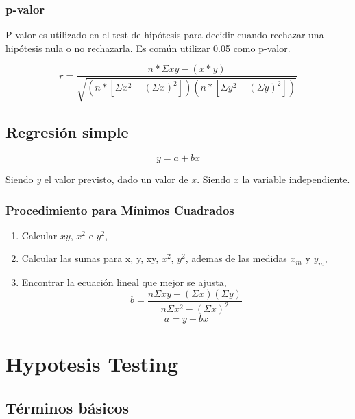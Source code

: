 \documentclass[]{article}
\begin{document}
\subsubsection{p-valor}

P-valor es utilizado en el test de hipótesis para decidir cuando rechazar una hipótesis nula o no rechazarla. Es común utilizar 0.05 como p-valor. 

\begin{equation}
r = \frac{n*\Sigma xy - (x*y)}{\sqrt{(n*[\Sigma x^2- (\Sigma x)^2])(n*[\Sigma y^2- (\Sigma y)^2])}}
\end{equation}

\subsection{Regresión simple}

\begin{equation}
y = a + bx
\end{equation}

Siendo $y$ el valor previsto, dado un valor de $x$. Siendo $x$ la variable independiente.

\subsubsection{Procedimiento para Mínimos Cuadrados}

\begin{enumerate}
	\item Calcular $xy$, $x^2$ e $y^2$,
	\item Calcular las sumas para x, y, xy, $x^2$, $y^2$, ademas de las medidas $x_m$ y $y_m$,
	\item Encontrar la ecuación lineal que mejor se ajusta,
	\begin{equation}
	b = \frac{n \Sigma xy - (\Sigma x)(\Sigma y)}{n \Sigma x^2 - (\Sigma x)^2}
	\end{equation}
	\begin{equation}
		a = y - bx 
	\end{equation}
\end{enumerate}

\section{Hypotesis Testing}

\subsection{Términos básicos}
\end{document}
